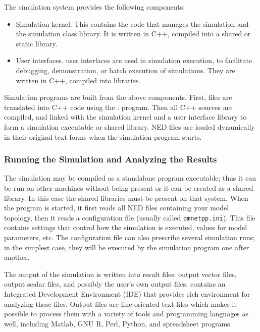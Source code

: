The simulation system provides the following components:
\begin{itemize}
  \item{Simulation kernel. This contains the
    code that manages the simulation and the simulation class library.
    It is written in C++, compiled into a shared or static library.}
  \item{User interfaces.
     {\opp} user interfaces
    are used in simulation execution, to facilitate debugging,
    demonstration, or batch execution of simulations. They are
    written in C++, compiled into libraries.}
\end{itemize}


Simulation programs are built from the above components. First,
 files are translated into C++ code using the .
program. Then all C++ sources are compiled, and linked with the simulation
kernel and a user interface library to form a simulation executable or
shared library. NED files are loaded dynamically in their original
text forms when the simulation program starts.


\subsubsection{Running the Simulation and Analyzing the Results}

The simulation may be compiled as a standalone program executable;
thus it can be run on other machines without {\opp}
being present or it can be created as a shared library. In this case the
{\opp} shared libraries must be present on that system.
When the program is started, it first reads all NED files
containing your model topology, then it reads a configuration
file (usually called
\texttt{omnetpp.ini}). This file contains settings that
control how the simulation is executed, values for model parameters, etc.
The configuration file can also prescribe several simulation runs; in
the simplest case, they will be executed by the simulation program one
after another.

The output of the simulation is written into result files: output vector
files, output scalar files,
and possibly the user's own output files.
{\opp} contains an Integrated Development Environment (IDE) that provides
rich environment for analyzing these files. Output files are line-oriented
text files which makes it possible to process them with a variety of tools
and programming languages as well, including Matlab, GNU R, Perl, Python,
and spreadsheet programs.


